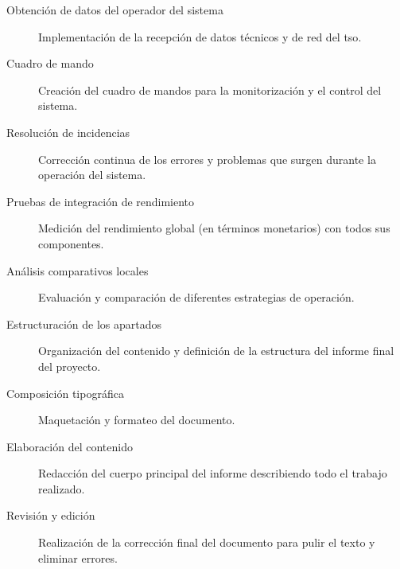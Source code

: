 \begin{description}
  \item[Obtención de datos del operador del sistema] Implementación de la recepción de datos técnicos y de red del \gls{tso}.

  \item[Cuadro de mando] Creación del cuadro de mandos para la monitorización y el control del sistema.

  \item[Resolución de incidencias] Corrección continua de los errores y problemas que surgen durante la operación del sistema.

  \item[Pruebas de integración de rendimiento] Medición del rendimiento global (en términos monetarios) con todos sus componentes.

  \item[Análisis comparativos locales] Evaluación y comparación de diferentes estrategias de operación.

  \item[Estructuración de los apartados] Organización del contenido y definición de la estructura del informe final del proyecto.

  \item[Composición tipográfica] Maquetación y formateo del documento.

  \item[Elaboración del contenido] Redacción del cuerpo principal del informe describiendo todo el trabajo realizado.

  \item[Revisión y edición] Realización de la corrección final del documento para pulir el texto y eliminar errores.

\end{description}
